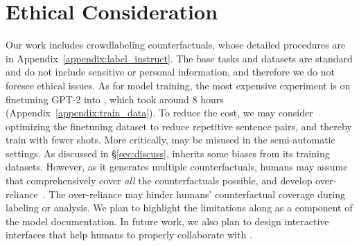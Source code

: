 
\section{Ethical Consideration}

Our work includes crowdlabeling counterfactuals, whose detailed procedures are in Appendix~\ref{appendix:label_instruct}.
The base tasks and datasets are standard and do not include sensitive or personal information, and therefore we do not foresee ethical issues. 
As for model training, the most expensive experiment is on finetuning GPT-2 into \sysname, which took around 8 hours (Appendix~\ref{appendix:train_data}).
To reduce the cost, we may consider optimizing the finetuning dataset to reduce repetitive sentence pairs, and thereby train \sysname with fewer shots.
More critically, \sysname may be misused in the semi-automatic settings. 
As discussed in \S\ref{sec:discuss}, \sysname inherits some biases from its training datasets.
However, as it generates multiple counterfactuals, humans may assume that \sysname comprehensively cover \emph{all} the counterfactuals possible, and develop over-reliance~\cite{bansal2021does}.
The over-reliance may hinder humans' counterfactual coverage during labeling or analysis.
We plan to highlight the limitations along as a component of the model documentation. 
In future work, we also plan to design interactive interfaces that help humans to properly collaborate with \sysname.
